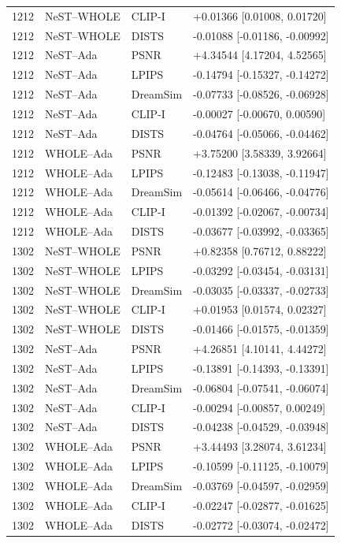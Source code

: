\documentclass[10pt,letterpaper]{article}
\begin{document}
\begin{longtable}{@{}rlll@{}}
1212 & NeST--WHOLE & CLIP-I & +0.01366 [0.01008, 0.01720]\\
1212 & NeST--WHOLE & DISTS & -0.01088 [-0.01186, -0.00992]\\
1212 & NeST--Ada & PSNR & +4.34544 [4.17204, 4.52565]\\
1212 & NeST--Ada & LPIPS & -0.14794 [-0.15327, -0.14272]\\
1212 & NeST--Ada & DreamSim & -0.07733 [-0.08526, -0.06928]\\
1212 & NeST--Ada & CLIP-I & -0.00027 [-0.00670, 0.00590]\\
1212 & NeST--Ada & DISTS & -0.04764 [-0.05066, -0.04462]\\
1212 & WHOLE--Ada & PSNR & +3.75200 [3.58339, 3.92664]\\
1212 & WHOLE--Ada & LPIPS & -0.12483 [-0.13038, -0.11947]\\
1212 & WHOLE--Ada & DreamSim & -0.05614 [-0.06466, -0.04776]\\
1212 & WHOLE--Ada & CLIP-I & -0.01392 [-0.02067, -0.00734]\\
1212 & WHOLE--Ada & DISTS & -0.03677 [-0.03992, -0.03365]\\
1302 & NeST--WHOLE & PSNR & +0.82358 [0.76712, 0.88222]\\
1302 & NeST--WHOLE & LPIPS & -0.03292 [-0.03454, -0.03131]\\
1302 & NeST--WHOLE & DreamSim & -0.03035 [-0.03337, -0.02733]\\
1302 & NeST--WHOLE & CLIP-I & +0.01953 [0.01574, 0.02327]\\
1302 & NeST--WHOLE & DISTS & -0.01466 [-0.01575, -0.01359]\\
1302 & NeST--Ada & PSNR & +4.26851 [4.10141, 4.44272]\\
1302 & NeST--Ada & LPIPS & -0.13891 [-0.14393, -0.13391]\\
1302 & NeST--Ada & DreamSim & -0.06804 [-0.07541, -0.06074]\\
1302 & NeST--Ada & CLIP-I & -0.00294 [-0.00857, 0.00249]\\
1302 & NeST--Ada & DISTS & -0.04238 [-0.04529, -0.03948]\\
1302 & WHOLE--Ada & PSNR & +3.44493 [3.28074, 3.61234]\\
1302 & WHOLE--Ada & LPIPS & -0.10599 [-0.11125, -0.10079]\\
1302 & WHOLE--Ada & DreamSim & -0.03769 [-0.04597, -0.02959]\\
1302 & WHOLE--Ada & CLIP-I & -0.02247 [-0.02877, -0.01625]\\
1302 & WHOLE--Ada & DISTS & -0.02772 [-0.03074, -0.02472]\\

\end{longtable}
\end{document}
